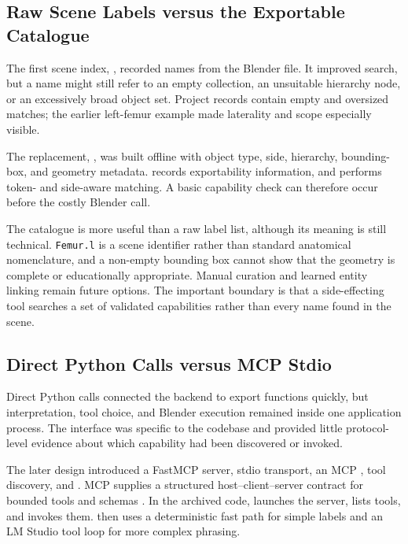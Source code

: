 \subsection{Raw Scene Labels versus the Exportable Catalogue}
\label{sec:evolution-exportable-catalog}

The first scene index, , recorded names from the Blender file. It improved search, but a name might still refer to an empty collection, an unsuitable hierarchy node, or an excessively broad object set. Project records contain empty and oversized matches; the earlier left-femur example made laterality and scope especially visible.

The replacement, , was built offline with object type, side, hierarchy, bounding-box, and geometry metadata.  records exportability information, and  performs token- and side-aware matching. A basic capability check can therefore occur before the costly Blender call.

The catalogue is more useful than a raw label list, although its meaning is still technical. \texttt{Femur.l} is a scene identifier rather than standard anatomical nomenclature, and a non-empty bounding box cannot show that the geometry is complete or educationally appropriate. Manual curation and learned entity linking remain future options. The important boundary is that a side-effecting tool searches a set of validated capabilities rather than every name found in the scene.

\subsection{Direct Python Calls versus MCP Stdio}
\label{sec:evolution-mcp}

Direct Python calls connected the backend to export functions quickly, but interpretation, tool choice, and Blender execution remained inside one application process. The interface was specific to the codebase and provided little protocol-level evidence about which capability had been discovered or invoked.

The later design introduced a FastMCP server, stdio transport, an MCP , tool discovery, and . MCP supplies a structured host--client--server contract for bounded tools and schemas \parencite{mcp20250618}. In the archived code,  launches the server, lists tools, and invokes them.  then uses a deterministic fast path for simple labels and an LM Studio tool loop for more complex phrasing.

